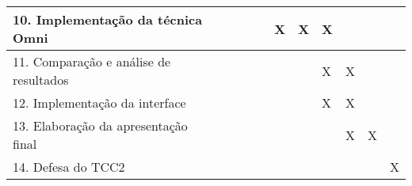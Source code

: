 \begin{quadro}[!htb]
\begin{tabular}{|p{5.0cm}|p{0.6cm}|p{0.6cm}|p{0.6cm}|p{0.6cm}|p{0.6cm}|p{0.6cm}|p{0.6cm}|p{0.6cm}|p{0.6cm}|p{0.6cm}|}
        \hline
        \footnotesize{10. Implementação da técnica Omni} 			     &  	             &              &  		   & 		  & X		 & X 	        & X 	       &   	      & 	     & 		     \\
        \hline
        \footnotesize{11. Comparação e análise de resultados} 			     &  	             &              &  		   & 		  &  		 &   	        &  X	       & X 	      & 	     & 		     \\
        \hline
        \footnotesize{12. Implementação da interface} 				     &  	             &              &  		   & 		  &  		 &   	        &  X	       &  X	      & 	     & 		     \\
        \hline
        \footnotesize{13. Elaboração da apresentação final} 			     &  	             &              &  		   & 		  &  		 &   	        &   	       &  X	      &  X	     & 		     \\
        \hline        
        \footnotesize{14. Defesa do TCC2}					     &  	             &              &  		   & 		  &  		 &   	        &   	       &   	      & 	     & X	     \\
        \hline
    \end{tabular}
\end{quadro}

